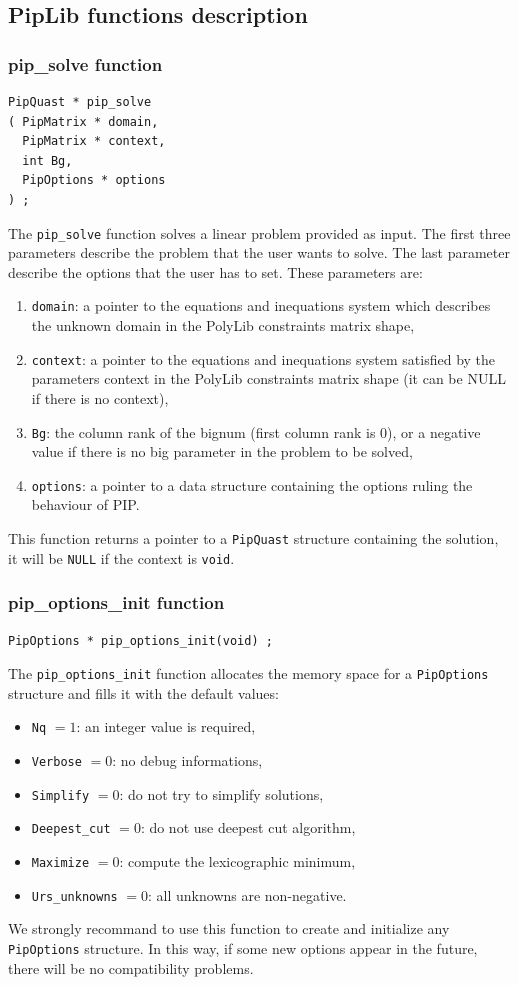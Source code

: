 \documentclass[12pt,a4paper]{article}
\begin{document}
\subsection{PipLib functions description}\label{PipLibfunc}
\subsubsection{pip\_solve function}
\begin{verbatim}
PipQuast * pip_solve
( PipMatrix * domain,
  PipMatrix * context,
  int Bg,
  PipOptions * options
) ;
\end{verbatim}
The {\tt pip\_solve} function solves a linear problem provided as input. The
first three parameters describe the problem that the user wants to solve.
The last parameter describe the options that the user has to set.
These parameters are:
\begin{enumerate}
\item {\tt domain}: a pointer to the equations and inequations system which
      describes the unknown domain in the PolyLib constraints matrix shape,
\item {\tt context}: a pointer to the equations and inequations system satisfied
      by the parameters context in the PolyLib constraints matrix shape
      (it can be NULL if there is no context),
\item {\tt Bg}: the column rank of the bignum (first column rank is 0), or a
      negative value if there is no big parameter in the problem to be solved, 
\item {\tt options}: a pointer to a data structure containing the options
      ruling the behaviour of PIP.
\end{enumerate}
This function returns a pointer to a {\tt PipQuast} structure containing the
solution, it will be {\tt NULL} if the context is {\tt void}.

\subsubsection{pip\_options\_init function}\label{optinit}
\begin{verbatim}
PipOptions * pip_options_init(void) ;
\end{verbatim}
The {\tt pip\_options\_init} function allocates the memory space for a
{\tt PipOptions} structure and fills it with the default values:
\begin{itemize}
\item {\tt Nq} $= 1$: an integer value is required,
\item {\tt Verbose} $= 0$: no debug informations,
\item {\tt Simplify} $= 0$: do not try to simplify solutions,
\item {\tt Deepest\_cut} $= 0$: do not use deepest cut algorithm,
\item {\tt Maximize} $= 0$: compute the lexicographic minimum,
\item \verb+Urs_unknowns+ $= 0$: all unknowns are non-negative.
\end{itemize}
We strongly recommand to use this function to create and initialize any
{\tt PipOptions} structure. In this way, if some new options appear in
the future, there will be no compatibility problems.
\end{document}

